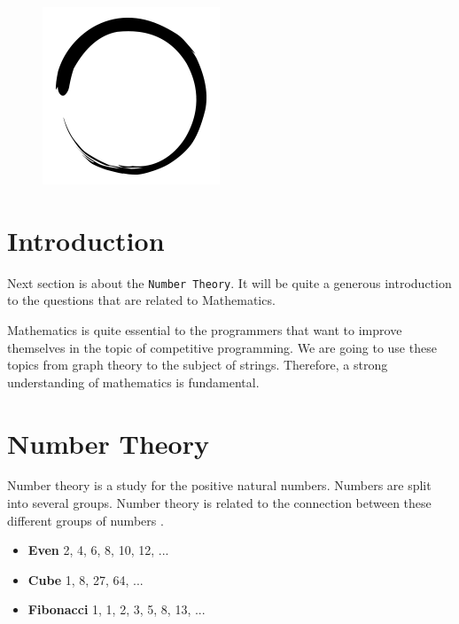 \documentclass[12pt]{article}
\title{\vspace{-2em}\mytitle\vspace{-0.3em}}
\author{\textbf{Editor}\\Sadık Ekin Özbay \\ \ \\ \textbf{Reviewers} \\Yusuf Hakan Kalaycı \\ Burak Buğrul \\ Kadır Emre Oto \\ \ \\ \textbf{Contributors} \\ Ömer Talip Akalın}
\date{}
\begin{document}
\begin{figure}
  \centering
  \includegraphics[width=\linewidth/4]{inzva-logo.png}
  \label{fig:inzva}
\end{figure}
\maketitle

\cleardoublepage
\tableofcontents
{}
\cleardoublepage

\section{Introduction}
Next section is about the \texttt{Number Theory}. It will be quite a generous introduction to the questions that are related to Mathematics.  

Mathematics is quite essential to the programmers that want to improve themselves in the topic of competitive programming. We are going to use these topics from graph theory to the subject of strings.  Therefore, a strong understanding of mathematics is fundamental.

\section{Number Theory}
Number theory is a study for the positive natural numbers. Numbers are split into several groups. Number theory is related to the connection between these different groups of numbers  \cite{numbertheory}.
\begin{itemize}
  \item \textbf{Even} \hspace{19mm} 2, 4, 6, 8, 10, 12, ...
  \item \textbf{Cube} \hspace{19mm} 1, 8, 27, 64, ...
  \item \textbf{Fibonacci} \hspace{10mm} 1, 1, 2, 3, 5, 8, 13, ...
\end{itemize}
\end{document}
